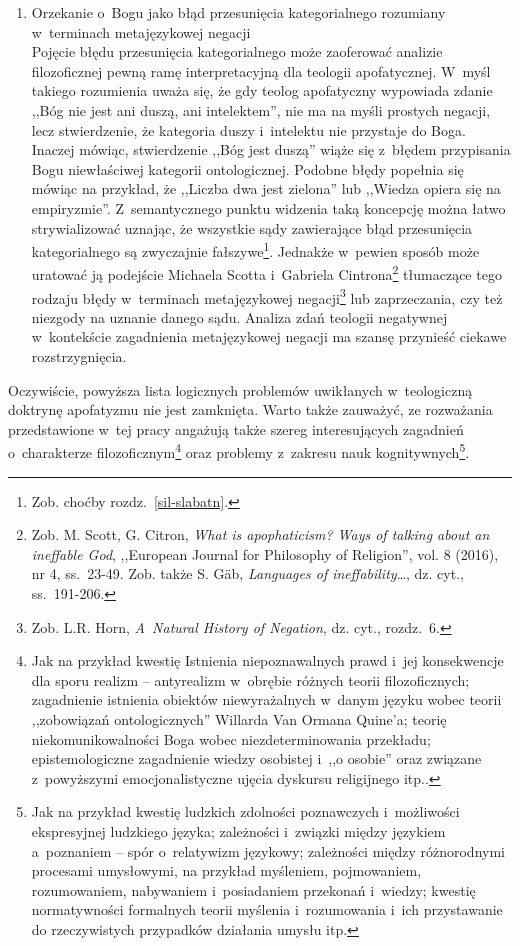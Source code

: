 \begin{enumerate}[label = \arabic*), itemindent=6mm, labelwidth=4mm, labelsep=2mm, itemsep=1em, leftmargin=0mm]
\item Orzekanie o~Bogu jako błąd przesunięcia kategorialnego rozumiany w~terminach metajęzykowej negacji\\
Pojęcie błędu przesunięcia kategorialnego może zaoferować analizie filozoficznej pewną ramę interpretacyjną dla teologii apofatycznej. W~myśl takiego rozumienia uważa się, że gdy teolog apofatyczny wypowiada zdanie ,,Bóg nie jest ani duszą, ani intelektem'', nie ma na myśli prostych negacji, lecz stwierdzenie, że kategoria duszy i~intelektu nie przystaje do Boga. Inaczej mówiąc, stwierdzenie ,,Bóg jest duszą'' wiąże się z~błędem przypisania Bogu niewłaściwej kategorii ontologicznej. Podobne błędy popełnia się mówiąc na przykład, że ,,Liczba dwa jest zielona'' lub ,,Wiedza opiera się na empiryzmie''. Z~semantycznego punktu widzenia taką koncepcję można łatwo strywializować uznając, że wszystkie sądy zawierające błąd przesunięcia kategorialnego są zwyczajnie fałszywe\footnote{Zob. choćby rozdz.~\ref{sil-slabatn}.}. Jednakże w~pewien sposób może uratować ją podejście Michaela Scotta i~Gabriela Cintrona\footnote{Zob. M. Scott, G. Citron, \textit{What is apophaticism? Ways of talking about an ineffable God}, ,,European Journal for Philosophy of Religion'', vol. 8 (2016), nr 4, ss.~23-49. Zob. także S. Gäb, \textit{Languages of ineffability}…, dz. cyt., ss.~191-206.} tłumaczące tego rodzaju błędy w~terminach metajęzykowej negacji\footnote{Zob. L.R. Horn, \textit{A~Natural History of Negation}, dz. cyt., rozdz.~6.} lub zaprzeczania, czy też niezgody na uznanie danego sądu. Analiza zdań teologii negatywnej w~kontekście zagadnienia metajęzykowej negacji ma szansę przynieść ciekawe rozstrzygnięcia.
\end{enumerate}

Oczywiście, powyższa lista logicznych problemów uwikłanych w~teologiczną doktrynę apofatyzmu nie jest zamknięta. Warto także zauważyć, ze rozważania przedstawione w~tej pracy angażują także szereg interesujących zagadnień o~charakterze filozoficznym\footnote{Jak na przykład kwestię Istnienia niepoznawalnych prawd i~jej konsekwencje dla sporu realizm -- antyrealizm w~obrębie różnych teorii filozoficznych; zagadnienie istnienia obiektów niewyrażalnych w~danym języku wobec teorii ,,zobowiązań ontologicznych'' Willarda Van Ormana Quine'a; teorię niekomunikowalności Boga wobec niezdeterminowania przekładu; epistemologiczne zagadnienie wiedzy osobistej i~,,o osobie'' oraz związane z~powyższymi emocjonalistyczne ujęcia dyskursu religijnego itp..} oraz problemy z~zakresu nauk kognitywnych\footnote{Jak na przykład kwestię ludzkich zdolności poznawczych i~możliwości ekspresyjnej ludzkiego języka; zależności i~związki między językiem a~poznaniem -- spór o~relatywizm językowy; zależności między różnorodnymi procesami umysłowymi, na przykład myśleniem, pojmowaniem, rozumowaniem, nabywaniem i~posiadaniem przekonań i~wiedzy; kwestię normatywności formalnych teorii myślenia i~rozumowania i~ich przystawanie do rzeczywistych przypadków działania umysłu itp.}.

